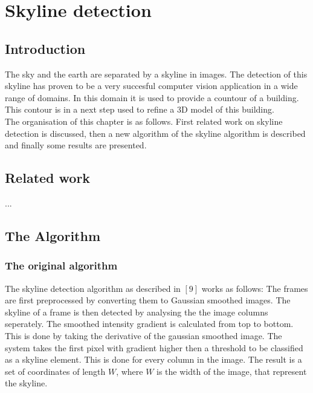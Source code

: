 \documentclass[10pt]{article}
\begin{document}
\section{Skyline detection}
 \subsection{Introduction}

The sky and the earth are separated by a skyline in images. The detection of this skyline
has proven to be a very succesful computer vision application in a wide range of
domains. In this domain it is used to provide a countour of a building. This
contour is in a next step used to refine a 3D model of this building.\\
The organisation of this chapter is as follows.  First related work on skyline
detection is discussed, then a new algorithm of the skyline algorithm is
described and finally some results are presented.\\
 \subsection{Related work}
 ...


 \subsection{The Algorithm}
 \subsubsection{The original algorithm}
The skyline detection algorithm as described in $[9]$ works as follows:
The frames are first preprocessed by converting them to Gaussian smoothed images.
The skyline of a frame is then detected by analysing the the image columns
seperately.
The smoothed intensity gradient is calculated from top to bottom. This is done
by taking the derivative of the gaussian smoothed image.
The system takes the first pixel with gradient higher then a threshold to be
classified as a skyline element.  This is done for every column in the image.
The result is a set of coordinates of length $W$,
where $W$ is the width of the image, that represent the skyline.
\end{document}

